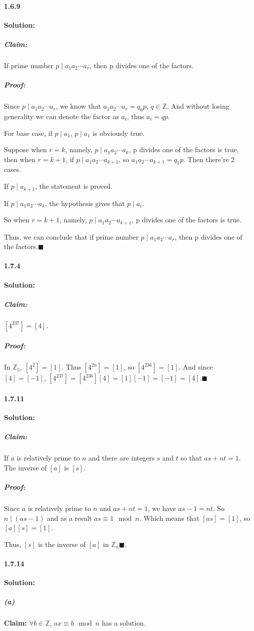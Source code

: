 \documentclass{article}[11pt]
\begin{document}
	\paragraph{1.6.9}\textbf{Solution: }
		\subparagraph{Claim:} If prime number $p \mid a_1a_2\cdots a_r$, then p divides one of the factors.
		\subparagraph{Proof:} Since $p \mid a_1a_2\cdots a_r$, we know that $a_1a_2\cdots a_r = q_0p$, $q \in \mathbb{Z}$. And without losing generality we can denote the factor as $a_i$, thus $a_i = qp$.
		
		For base case, if $p \mid a_1$, $p \mid a_1$ is obviously true.
		
		Suppose when $r = k$, namely, $p \mid a_1a_2\cdots a_k$, p divides one of the factors is true, then when $r = k + 1$, if $p \mid a_1a_2\cdots a_{k + 1}$, so $a_1a_2\cdots a_{k + 1} = q_1p$. Then there're 2 cases.
		
		If $p \mid a_{k+1}$, the statement is proved.
		
		If $p \mid a_1a_2\cdots a_k$, the hypothesis gives that $p \mid a_i$.
		
		So when $r = k+1$, namely, $p \mid a_1a_2\cdots a_{k+1}$, p divides one of the factors is true.
		
		Thus, we can conclude that if prime number $p \mid a_1a_2\cdots a_r$, then p divides one of the factors.$\blacksquare$
	\paragraph{1.7.4}\textbf{Solution: }
		\subparagraph{Claim:} $[4^{237}] = [4]$.
		\subparagraph{Proof:} In $\mathbb{Z}_5$, $[4^2] = [1]$. Thus $[4^{2n}] = [1]$, so $[4^{236}] = [1]$. And since $[4] = [-1]$, $[4^{237}] = [4^{236}][4] = [1][-1] = [-1] = [4].\blacksquare$
	\paragraph{1.7.11}\textbf{Solution: }
		\subparagraph{Claim:} If $a$ is relatively prime to $n$ and there are integers $s$ and $t$ so that $as + nt = 1$. The inverse of $[a]$ is $[s]$.
		\subparagraph{Proof:} Since $a$ is relatively prime to $n$ and $as + nt = 1$, we have $as - 1 = nt$. So $n \mid (as - 1)$ and as a result $as \equiv 1 \mod n$. Which means that $[as] = [1]$, so $[a][s] = [1]$.
		
		Thus, $[s]$ is the inverse of $[a]$ in $\mathbb{Z}_n\blacksquare$.
	\paragraph{1.7.14}\textbf{Solution: }
		\subparagraph{(a)} 
			\textbf{Claim: }$\forall b \in \mathbb{Z}$, $ax\equiv b\mod n$ has a solution.\\
			
\end{document}
